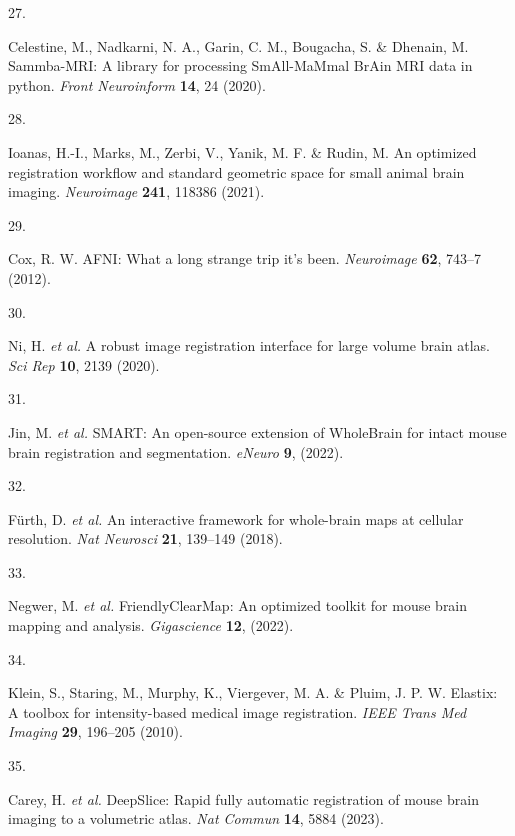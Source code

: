 \documentclass[
  12pt,
]{article}
\newlength{\cslhangindent}
\newlength{\csllabelwidth}
\newenvironment{CSLReferences}[2] %
 {%
  \setlength{\parindent}{0pt}
  \ifodd #1 \everypar{\setlength{\hangindent}{\cslhangindent}}\ignorespaces\fi
  \ifnum #2 > 0
  \setlength{\parskip}{#2\baselineskip}
  \fi
 }%
 {}
\newcommand{\CSLLeftMargin}[1]{\parbox[t]{\csllabelwidth}{#1}}
\newcommand{\CSLRightInline}[1]{\parbox[t]{\linewidth - \csllabelwidth}{#1}\break}
\begin{document}
\begin{CSLReferences}{0}{0}
\leavevmode{}%
\CSLLeftMargin{27. }
\CSLRightInline{Celestine, M., Nadkarni, N. A., Garin, C. M., Bougacha,
S. \& Dhenain, M. Sammba-MRI: A library for processing SmAll-MaMmal
BrAin MRI data in python. \emph{Front Neuroinform} \textbf{14}, 24
(2020).}

\leavevmode{}%
\CSLLeftMargin{28. }
\CSLRightInline{Ioanas, H.-I., Marks, M., Zerbi, V., Yanik, M. F. \&
Rudin, M. An optimized registration workflow and standard geometric
space for small animal brain imaging. \emph{Neuroimage} \textbf{241},
118386 (2021).}

\leavevmode{}%
\CSLLeftMargin{29. }
\CSLRightInline{Cox, R. W. {AFNI}: What a long strange trip it's been.
\emph{Neuroimage} \textbf{62}, 743--7 (2012).}

\leavevmode{}%
\CSLLeftMargin{30. }
\CSLRightInline{Ni, H. \emph{et al.} A robust image registration
interface for large volume brain atlas. \emph{Sci Rep} \textbf{10}, 2139
(2020).}

\leavevmode{}%
\CSLLeftMargin{31. }
\CSLRightInline{Jin, M. \emph{et al.} SMART: An open-source extension of
WholeBrain for intact mouse brain registration and segmentation.
\emph{eNeuro} \textbf{9}, (2022).}

\leavevmode{}%
\CSLLeftMargin{32. }
\CSLRightInline{Fürth, D. \emph{et al.} An interactive framework for
whole-brain maps at cellular resolution. \emph{Nat Neurosci}
\textbf{21}, 139--149 (2018).}

\leavevmode{}%
\CSLLeftMargin{33. }
\CSLRightInline{Negwer, M. \emph{et al.} FriendlyClearMap: An optimized
toolkit for mouse brain mapping and analysis. \emph{Gigascience}
\textbf{12}, (2022).}

\leavevmode{}%
\CSLLeftMargin{34. }
\CSLRightInline{Klein, S., Staring, M., Murphy, K., Viergever, M. A. \&
Pluim, J. P. W. Elastix: A toolbox for intensity-based medical image
registration. \emph{IEEE Trans Med Imaging} \textbf{29}, 196--205
(2010).}

\leavevmode{}%
\CSLLeftMargin{35. }
\CSLRightInline{Carey, H. \emph{et al.} DeepSlice: Rapid fully automatic
registration of mouse brain imaging to a volumetric atlas. \emph{Nat
Commun} \textbf{14}, 5884 (2023).}


\end{CSLReferences}
\end{document}

